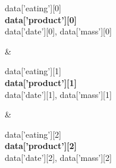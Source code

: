 \begin{minipage}{6cm}
            \centering\LARGE
            \strut
            {{data['eating'][0]}} \\ {\bf {{data['product'][0]}}} \\ {{data['date'][0]}}, {{data['mass'][0]}}
            \strut
        \end{minipage}                          &   \begin{minipage}{6cm}
                                                        \centering\LARGE
                                                        \strut
                                                        {{data['eating'][1]}} \\ {\bf {{data['product'][1]}}} \\ {{data['date'][1]}}, {{data['mass'][1]}}
                                                        \strut
                                                    \end{minipage}                          &   \begin{minipage}{6cm}
                                                                                                    \centering\LARGE
                                                                                                    \strut
                                                                                                    {{data['eating'][2]}} \\ {\bf {{data['product'][2]}}} \\ {{data['date'][2]}}, {{data['mass'][2]}}
                                                                                                    \strut
                                                                                                \end{minipage}                          \\ 
\hline \\[2pt] \hline